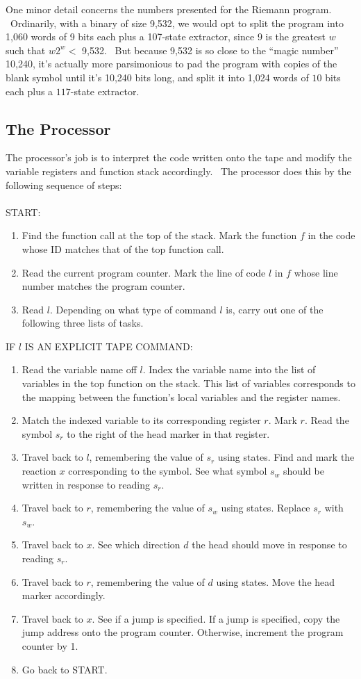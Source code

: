 \documentclass[11pt]{article}
\begin{document}
One minor detail concerns the numbers presented for the Riemann program. \ Ordinarily, with a binary of size 9,532, we would opt to split the program into 1,060 words of 9 bits each plus a 107-state extractor, since 9 is the greatest $w$ such that $w2^w <$ 9,532. \ But because 9,532 is so close to the ``magic number'' 10,240, it's actually more parsimonious to pad the program with copies of the blank symbol until it's 10,240 bits long, and split it into 1,024 words of $10$ bits each plus a $117$-state extractor.


\subsection{The Processor}

The processor's job is to interpret the code written onto the tape and modify the variable registers and function stack accordingly. \ The processor does this by the following sequence of steps:  \\ \\
START:
\begin{enumerate}
\item Find the function call at the top of the stack. Mark the function $f$ in the code whose ID matches that of the top function call.
\item Read the current program counter. Mark the line of code $l$ in $f$ whose line number matches the program counter.
\item Read $l$. Depending on what type of command $l$ is, carry out one of the following three lists of tasks.
\end{enumerate}

\noindent IF $l$ IS AN EXPLICIT TAPE COMMAND:
\begin{enumerate}
\item Read the variable name off $l$. Index the variable name into the list of variables in the top function on the stack. This list of variables corresponds to the mapping between the function's local variables and the register names.
\item Match the indexed variable to its corresponding register $r$. Mark $r$. Read the symbol $s_r$ to the right of the head marker in that register.
\item Travel back to $l$, remembering the value of $s_r$ using states. Find and mark the reaction $x$ corresponding to the symbol. See what symbol $s_w$ should be written in response to reading $s_r$.
\item Travel back to $r$, remembering the value of $s_w$ using states. Replace $s_r$ with $s_w$.
\item Travel back to $x$. See which direction $d$ the head should move in response to reading $s_r$.
\item Travel back to $r$, remembering the value of $d$ using states. Move the head marker accordingly.
\item Travel back to $x$. See if a jump is specified. If a jump is specified, copy the jump address onto the program counter. Otherwise, increment the program counter by 1.
\item Go back to START.
\end{enumerate}
\end{document}
